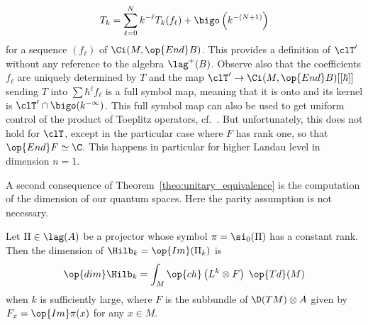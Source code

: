 \[
T_k = \sum_{\ell =0}^{N} k^{-\ell} T_{k} (f_\ell) + \bigo \left(k^{-(N+1)}\right)
\]
for a sequence $(f_\ell)$ of $\Ci (M, \op{End} B)$. This provides a definition of $\clT'$ without any reference to the algebra $\lag ^{+} (B)$. Observe also that the coefficients $f_{\ell}$ are uniquely determined by $T$ and the map $\clT' \rightarrow \Ci (M, \op{End} B) [[\hbar]]$ sending $T$ into $\sum \hbar^\ell f_{\ell}$ is a full symbol map, meaning that it is onto and its kernel is $\clT' \cap \bigo (k^{-\infty})$. This full symbol map can also be used to get uniform control of the product of Toeplitz operators, cf.~\cite{oim}. But unfortunately, this does not hold for $\clT$, except in the particular case where $F$ has rank one, so that $\op{End} F \simeq \C$. This happens in particular for higher Landau level in dimension $n=1$.

A second consequence of Theorem~\ref{theo:unitary_equivalence} is the computation of the dimension of our quantum spaces.  Here the parity assumption is not necessary.


\begin{theo}\label{theo:dim_general}
Let $\Pi \in \lag (A)$ be a projector whose symbol $\pi = \si_0 (\Pi)$ has a constant rank. Then the dimension of $\Hilb_k= \op{Im}(\Pi_k)$ is
\[
\op{dim} \Hilb_k = \int_M \op{ch} \left(L^k \otimes F\right) \; \op{Td}
(M)
\]
when $k$ is sufficiently large, where $F$ is the subbundle of $\D (TM) \otimes A$ given by $F_x = \op{Im} \pi (x)$ for any $x \in M$.
\end{theo}




